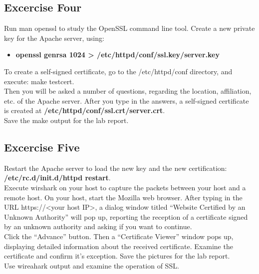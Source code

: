 \documentclass[10pt,a4paper]{article}
\numberwithin{equation}{section}
\numberwithin{figure}{section}
\numberwithin{table}{section}
\begin{document}
\subsection*{Excercise Four}
Run man openssl to study the OpenSSL command line tool.
Create a new private key for the Apache server, using:

\begin{itemize}
	\setlength{\itemindent}{10pt}
	\item [] \textbf{openssl genrsa 1024 > /etc/httpd/conf/ssl.key/server.key} 
\end{itemize}

To create a self-signed certificate, go to the /etc/httpd/conf directory, and execute: make testcert. \\

Then you will be asked a number of questions, regarding the location, affiliation, etc. of the Apache server. After you type in the answers, a self-signed certificate is created at \textbf{/etc/httpd/conf/ssl.crt/server.crt}. \\

Save the make output for the lab report.

\subsection*{Excercise Five}
Restart the Apache server to load the new key and the new certification: \textbf{/etc/rc.d/init.d/httpd restart}.\\

Execute wirshark on your host  to capture the packets between your host and a remote host. On your host, start the Mozilla web browser. After typing in the URL https://<your host IP>, a dialog window titled “Website Certified by an Unknown Authority” will pop up, reporting the reception of a certificate signed by an unknown authority and asking if you want to continue. \\

Click the “Advance” button. Then a “Certificate Viewer” window pops up, displaying detailed information about the received certificate. Examine the certificate and confirm it's exception. Save the pictures for the lab report. \\

Use wireahark output and examine the operation of SSL.
\end{document}
